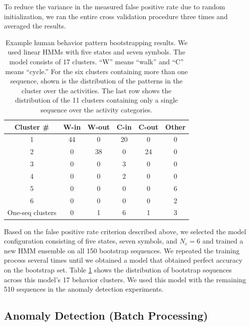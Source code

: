 To reduce the variance in the measured false positive rate due to
random initialization, we ran the entire cross validation procedure
three times and averaged the results.

\begin{table}[t]
  \caption[Example human behavior pattern bootstrapping
    results.]{\small Example human behavior pattern bootstrapping
    results. We used linear HMMs with five states and seven
    symbols. The model consists of 17 clusters. ``W'' means ``walk''
    and ``C'' means ``cycle.'' For the six clusters containing more
    than one sequence, shown is the distribution of the patterns in
    the cluster over the activities.  The last row shows the
    distribution of the 11 clusters containing only a single sequence
    over the activity categories.}
  \begin{center}
    \begin{tabular}{c|c|c|c|c|c}
      \hline
      Cluster \# & W-in & W-out & C-in & C-out & Other \\
      \hline \hline
      1 & 44 & 0  & 20 & 0  & 0 \\ \hline
      2 & 0  & 38 & 0  & 24 & 0 \\ \hline
      3 & 0  & 0  & 3  & 0  & 0 \\ \hline
      4 & 0  & 0  & 2  & 0  & 0 \\ \hline
      5 & 0  & 0  & 0  & 0  & 6 \\ \hline
      6 & 0  & 0  & 0  & 0  & 2 \\ \hline
      One-seq clusters & 0 & 1 & 6 & 1 & 3 \\ \hline
    \end{tabular}
  \end{center}
  \label{tab:bootstrapping-results}
\end{table}

Based on the false positive rate criterion described above, we
selected the model configuration consisting of five states, seven
symbols, and $N_c = 6$ and trained a new HMM ensemble on all 150
bootstrap sequences.  We repeated the training process several times
until we obtained a model that obtained perfect accuracy on the
bootstrap set.  Table \ref{tab:bootstrapping-results} shows the
distribution of bootstrap sequences across this model's 17 behavior
clusters. We used this model with the remaining 510 sequences in the
anomaly detection experiments.

\subsection{Anomaly Detection (Batch Processing)}
\label{incremental-against-global-method}

